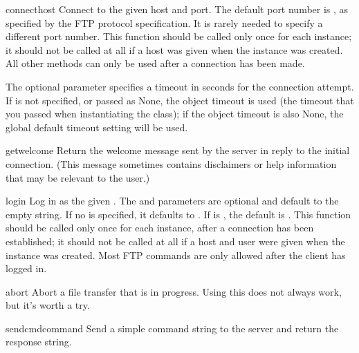 \begin{methoddesc}[FTP]{connect}{host}
Connect to the given host and port.  The default port number is , as
specified by the FTP protocol specification.  It is rarely needed to
specify a different port number.  This function should be called only
once for each instance; it should not be called at all if a host was
given when the instance was created.  All other methods can only be
used after a connection has been made.

The optional  parameter specifies a timeout in seconds for
the connection attempt. If is not specified, or passed as None, the 
object timeout is used (the timeout that you passed when instantiating the
class); if the object timeout is also None, the global default timeout 
setting will be used.
\end{methoddesc}

\begin{methoddesc}[FTP]{getwelcome}{}
Return the welcome message sent by the server in reply to the initial
connection.  (This message sometimes contains disclaimers or help
information that may be relevant to the user.)
\end{methoddesc}

\begin{methoddesc}[FTP]{login}{}
Log in as the given .  The  and 
parameters are optional and default to the empty string.  If no
 is specified, it defaults to .  If
 is , the default  is
.  This function should be called only
once for each instance, after a connection has been established; it
should not be called at all if a host and user were given when the
instance was created.  Most FTP commands are only allowed after the
client has logged in.
\end{methoddesc}

\begin{methoddesc}[FTP]{abort}{}
Abort a file transfer that is in progress.  Using this does not always
work, but it's worth a try.
\end{methoddesc}

\begin{methoddesc}[FTP]{sendcmd}{command}
Send a simple command string to the server and return the response
string.
\end{methoddesc}

